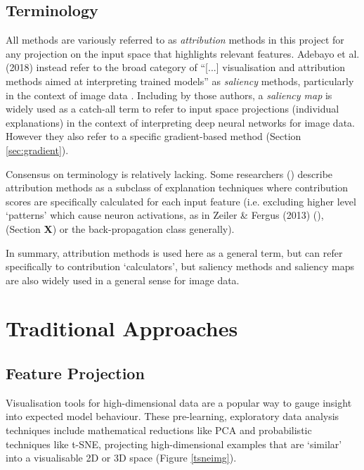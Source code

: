 \documentclass[main]{subfiles}
\begin{document}
\subsection*{Terminology}
All methods are variously referred to as \textit{attribution} methods in this project for any projection on the input space that highlights relevant features. Adebayo et al. (2018) instead refer to the broad category of ``[...] visualisation and attribution methods aimed at interpreting trained models'' as \textit{saliency} methods, particularly in the context of image data \cite{sanity}. Including by those authors, a \textit{saliency map} is widely used as a catch-all term to refer to input space projections (individual explanations) in the context of interpreting deep neural networks for image data. However they also refer to a specific gradient-based method (Section \ref{sec:gradient}). 

Consensus on terminology is relatively lacking. Some researchers (\cite{patternnet}) describe attribution methods as a subclass of explanation techniques where contribution scores are specifically calculated for each input feature (i.e. excluding higher level `patterns' which cause neuron activations, as in Zeiler \& Fergus (2013) (\cite{zeilerfergus2013}), (Section \textbf{X}) or the back-propagation class generally). 

In summary, attribution methods is used here as a general term, but can refer specifically to contribution `calculators', but saliency methods and saliency maps are also widely used in a general sense for image data.


\section{Traditional Approaches}

\subsection{Feature Projection}
Visualisation tools for high-dimensional data are a popular way to gauge insight into expected model behaviour.  These pre-learning, exploratory data analysis techniques include mathematical reductions like PCA and probabilistic techniques like t-SNE,  projecting high-dimensional examples that are `similar' into a visualisable 2D or 3D space \cite{tsnepaper} (Figure \ref{tsneimg}).
\end{document}
